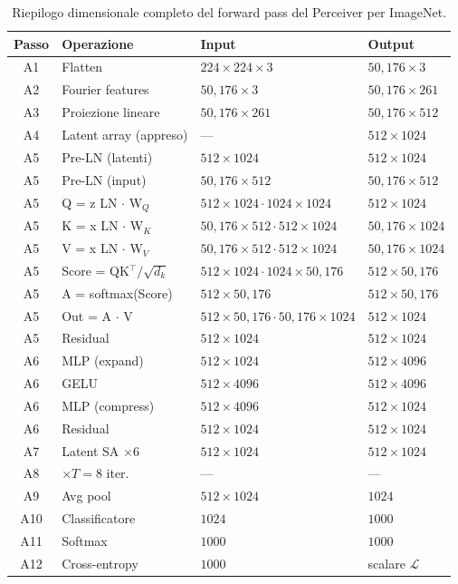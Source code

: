 \documentclass[12pt,a4paper]{article}
\begin{document}
\begin{table}[htbp]
\centering
\caption{Riepilogo dimensionale completo del forward pass del Perceiver per ImageNet.}
\begin{tabular}{@{}clll@{}}
\toprule
\textbf{Passo} & \textbf{Operazione} & \textbf{Input} & \textbf{Output} \\
\midrule
A1 & Flatten & $224 \times 224 \times 3$ & $50{,}176 \times 3$ \\
A2 & Fourier features & $50{,}176 \times 3$ & $50{,}176 \times 261$ \\
A3 & Proiezione lineare & $50{,}176 \times 261$ & $50{,}176 \times 512$ \\
A4 & Latent array (appreso) & --- & $512 \times 1024$ \\
A5 & Pre-LN (latenti) & $512 \times 1024$ & $512 \times 1024$ \\
A5 & Pre-LN (input) & $50{,}176 \times 512$ & $50{,}176 \times 512$ \\
A5 & Q = z LN $\cdot$ W$_Q$ & $512 \times 1024 \cdot 1024 \times 1024$ & $512 \times 1024$ \\
A5 & K = x LN $\cdot$ W$_K$ & $50{,}176 \times 512 \cdot 512 \times 1024$ & $50{,}176 \times 1024$ \\
A5 & V = x LN $\cdot$ W$_V$ & $50{,}176 \times 512 \cdot 512 \times 1024$ & $50{,}176 \times 1024$ \\
A5 & Score = QK$^\top/\sqrt{d_k}$ & $512 \times 1024 \cdot 1024 \times 50{,}176$ & $512 \times 50{,}176$ \\
A5 & A = softmax(Score) & $512 \times 50{,}176$ & $512 \times 50{,}176$ \\
A5 & Out = A $\cdot$ V & $512 \times 50{,}176 \cdot 50{,}176 \times 1024$ & $512 \times 1024$ \\
A5 & Residual & $512 \times 1024$ & $512 \times 1024$ \\
A6 & MLP (expand) & $512 \times 1024$ & $512 \times 4096$ \\
A6 & GELU & $512 \times 4096$ & $512 \times 4096$ \\
A6 & MLP (compress) & $512 \times 4096$ & $512 \times 1024$ \\
A6 & Residual & $512 \times 1024$ & $512 \times 1024$ \\
A7 & Latent SA $\times 6$ & $512 \times 1024$ & $512 \times 1024$ \\
A8 & $\times T = 8$ iter. & --- & --- \\
A9 & Avg pool & $512 \times 1024$ & $1024$ \\
A10 & Classificatore & $1024$ & $1000$ \\
A11 & Softmax & $1000$ & $1000$ \\
A12 & Cross-entropy & $1000$ & scalare $\mathcal{L}$ \\
\bottomrule
\end{tabular}
\end{table}
\end{document}
